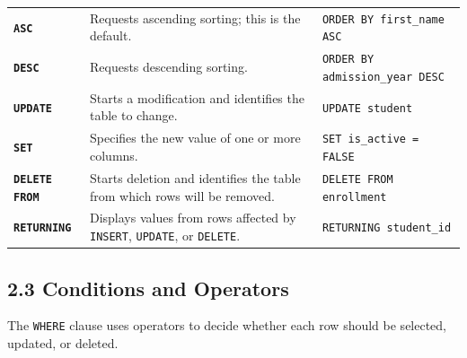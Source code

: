 \documentclass[12pt,a4paper]{article}
\begin{document}
\begin{longtable}{>{\bfseries}p{2.7cm} p{4cm} p{5.8cm}}
\texttt{ASC} & Requests ascending sorting; this is the default. &
\texttt{ORDER BY first\_name ASC} \\

\texttt{DESC} & Requests descending sorting. &
\texttt{ORDER BY admission\_year DESC} \\

\texttt{UPDATE} & Starts a modification and identifies the table to change. &
\texttt{UPDATE student} \\

\texttt{SET} & Specifies the new value of one or more columns. &
\texttt{SET is\_active = FALSE} \\

\texttt{DELETE FROM} & Starts deletion and identifies the table from which rows will be removed. &
\texttt{DELETE FROM enrollment} \\

\texttt{RETURNING} & Displays values from rows affected by \texttt{INSERT}, \texttt{UPDATE}, or \texttt{DELETE}. &
\texttt{RETURNING student\_id} \\

\end{longtable}
\endgroup

\subsection*{2.3 Conditions and Operators}
The \texttt{WHERE} clause uses operators to decide whether each row should be selected, updated, or
deleted.
\end{document}
